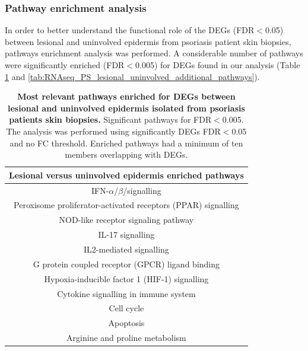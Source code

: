 \subsubsection{Pathway enrichment analysis}

In order to better understand the functional role of the DEGs (FDR$<$0.05) between lesional and uninvolved epidermis from psoriasis patient skin biopsies, pathways enrichment analysis was performed. A considerable number of pathways were significantly enriched (FDR$<$0.005) for DEGs found in our analysis (Table \ref{tab:RNAseq_PS_lesional_uninvolved_pathway_enrichment} and \ref{tab:RNAseq_PS_lesional_uninvolved_additional_pathways}). 


\begin{table}[htbp]
\centering
\begin{tabular}{@{}c}
\toprule
\textbf{Lesional versus uninvolved epidermis enriched pathways} \\
\midrule
\midrule
IFN-$\alpha$/$\beta$/signalling \\
Peroxisome proliferator-activated receptors (PPAR) signalling \\
NOD-like receptor signaling pathway \\
IL-17 signalling \\
IL2-mediated signalling \\
G protein coupled receptor (GPCR) ligand binding \\
Hypoxia-inducible factor 1 (HIF-1) signalling \\
Cytokine signalling in immune system \\
Cell cycle \\
Apoptosis \\
Arginine and proline metabolism \\
\bottomrule
\end{tabular}
\medskip %
\caption[Most relevant pathways enriched for DEGs between lesional and uninvolved epidermis isolated from psoriasis patients skin biopsies.]{\textbf{Most relevant pathways enriched for DEGs between lesional and uninvolved epidermis isolated from psoriasis patients skin biopsies.} Significant pathways for FDR$<$0.005. The analysis was performed using significantly DEGs FDR$<$0.05 and no FC threshold. Enriched pathways had a minimum of ten members overlapping with DEGs.}
\label{tab:RNAseq_PS_lesional_uninvolved_pathway_enrichment}
\end{table}


